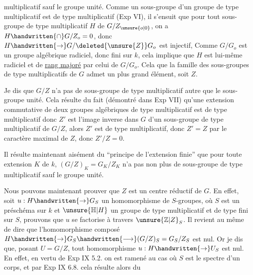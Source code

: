 multiplicatif  sauf le groupe unité. Comme un sous-groupe d'un \margin{$\bullet$} groupe de type multiplicatif est de type multiplicatif (Exp VI\quad ), il s'ensuit que  pour tout sous-groupe de type multiplicatif $H$ de $G/Z_{\unsure{o|0}}$, on a $H\handwritten{\cap}G/Z_o=0$, donc $H\handwritten{\to}G/\deleted{\unsure{Z}}G_o$ est injectif, Comme $G/G_o$ est un groupe algébrique radiciel, donc fini sur $k$, cela implique que $H$ est lui-même radiciel et de \uline{rang majoré} par celui de $G/G_o$. Cela  que la famille des sous-groupes de type multiplicatifs de $G$ admet un plus grand élément, soit $Z$.

Je dis que $G/Z$ n'a pas de sous-groupe de type multiplicatif autre que le sous-groupe unité. Cela résulte du fait (démontré dans \margin{$\bullet$} Exp VII\quad ) qu'une extension commutative de deux groupes algébriques de type multiplicatif est de type multiplicatif\handwritten{;}   donc $Z'$ est l'image inverse dans $G$ d'un sous-groupe de type multiplicatif de $G/Z$, alors $Z'$ est de type multiplicatif, donc $Z'=Z$ par le caractère maximal de $Z$, donc $Z'/Z=0$.

Il résulte maintenant aisément du \textquotedblleft principe de l'extension finie'' que pour toute extension $K$ de $k$, $(G/Z)_K=G_K/Z_K$ n'a pas non plus de sous-groupe de type multiplicatif sauf le groupe unité.

Nous pouvons maintenant prouver que $Z$ est un centre réductif de $G$. En effet, soit $u:H\handwritten{\to}G_S$ un homomorphisme de $S$-groupes, où $S$ est un préschéma sur $k$ et $\unsure{\mathbb H|H}$ un groupe de type multiplicatif et de type fini sur $S$, prouvons que $u$ se factorise à travers $\unsure{\mathbb Z|Z}_S$. Il revient au même de dire que l'homomorphisme composé $H\handwritten{\to}G_S\handwritten{\longrightarrow}(G/Z)_S=G_S/Z_S$ est nul. Or je dis que, posant $U=G/Z$, tout homomorphisme $u:H\handwritten{\to}U_S$ est nul. En effet, en vertu de Exp IX 5.2. on est ramené au cas où $S$ est le spectre d'un corps, et par Exp IX 6.8. cela résulte alors du
